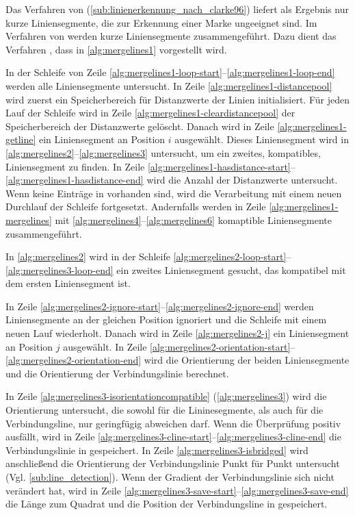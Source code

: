 Das Verfahren von \citeauthor{clarke96} (\autoref{sub:linienerkennung_nach_clarke96}) liefert als Ergebnis nur kurze
 Liniensegmente, die zur Erkennung einer Marke ungeeignet sind. Im Verfahren von \citeauthor{hirzer08} werden kurze
 Liniensegmente zusammengeführt. Dazu dient das Verfahren , dass in \autoref{alg:mergelines1}
 vorgestellt wird.



In der Schleife von Zeile \ref{alg:mergelines1-loop-start}--\ref{alg:mergelines1-loop-end} werden alle Liniensegmente
 untersucht. In Zeile \ref{alg:mergelines1-distancepool} wird zuerst ein Speicherbereich für Distanzwerte der Linien
 initialisiert. Für jeden Lauf der Schleife wird in Zeile \ref{alg:mergelines1-cleardistancepool} der Speicherbereich
 der Distanzwerte gelöscht. Danach wird in Zeile \ref{alg:mergelines1-getline} ein Liniensegment an Position $i$
 ausgewählt. Dieses Liniensegment wird in \autoref{alg:mergelines2}--\autoref{alg:mergelines3} untersucht, um ein
 zweites, kompatibles, Liniensegment zu finden. In Zeile
 \ref{alg:mergelines1-hasdistance-start}--\ref{alg:mergelines1-hasdistance-end} wird die Anzahl der Distanzwerte
 untersucht. Wenn keine Einträge in  vorhanden sind, wird die Verarbeitung mit einem neuen
 Durchlauf der Schleife fortgesetzt. Andernfalls werden in Zeile \ref{alg:mergelines1-mergelines} mit
 \autoref{alg:mergelines4}--\autoref{alg:mergelines6} komaptible Liniensegmente zusammengeführt.

In \autoref{alg:mergelines2} wird in der Schleife \ref{alg:mergelines2-loop-start}--\ref{alg:mergelines3-loop-end} ein
 zweites Liniensegment gesucht, das kompatibel mit dem ersten Liniensegment ist.



In Zeile \ref{alg:mergelines2-ignore-start}--\ref{alg:mergelines2-ignore-end} werden Liniensegmente an der gleichen
 Position ignoriert und die Schleife mit einem neuen Lauf wiederholt. Danach wird in Zeile \ref{alg:mergelines2-j} ein
 Liniensegment an Position $j$ ausgewählt. In Zeile
 \ref{alg:mergelines2-orientation-start}--\ref{alg:mergelines2-orientation-end} wird die Orientierung der beiden
 Liniensegmente und die Orientierung der Verbindungslinie berechnet.

In Zeile \ref{alg:mergelines3-isorientationcompatible} (\autoref{alg:mergelines3}) wird die Orientierung untersucht,
 die sowohl für die Lininesegmente, als auch für die Verbindungsline, nur geringfügig abweichen darf. Wenn die
 Überprüfung positiv ausfällt, wird in Zeile \ref{alg:mergelines3-cline-start}--\ref{alg:mergelines3-cline-end} die
 Verbindungslinie in  gespeichert. In Zeile \ref{alg:mergelines3-isbridged} wird anschließend die
 Orientierung der Verbindungslinie Punkt für Punkt untersucht (Vgl. \autoref{sub:line_detection}). Wenn der Gradient
 der Verbindungslinie sich nicht verändert hat, wird in Zeile
 \ref{alg:mergelines3-save-start}--\ref{alg:mergelines3-save-end} die Länge zum Quadrat und die Position der
 Verbindungsline in  gespeichert.

